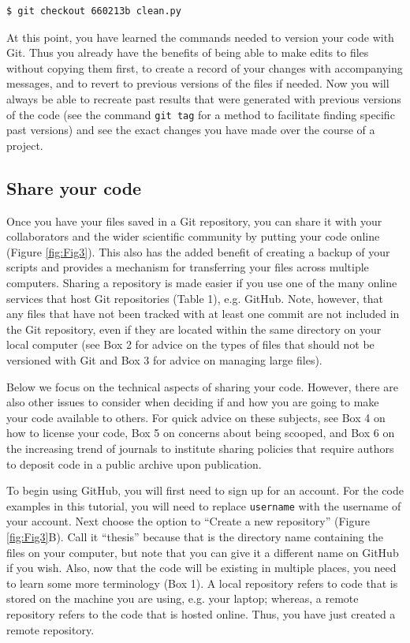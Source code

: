 \documentclass[10pt]{article}
\begin{document}
\begin{verbatim}
$ git checkout 660213b clean.py
\end{verbatim}

At this point, you have learned the commands needed to version your code with Git.
Thus you already have the benefits of being able to make edits to files without copying them first, to create a record of your changes with accompanying messages, and to revert to previous versions of the files if needed.
Now you will always be able to recreate past results that were generated with previous versions of the code (see the command \verb|git tag| for a method to facilitate finding specific past versions) and see the exact changes you have made over the course of a project.


\subsection{Share your code}

Once you have your files saved in a Git repository, you can share it with your collaborators and the wider scientific community by putting your code online (Figure \ref{fig:Fig3}).
This also has the added benefit of creating a backup of your scripts and provides a mechanism for transferring your files across multiple computers.
Sharing a repository is made easier if you use one of the many online services that host Git repositories (Table 1), e.g. GitHub.
Note, however, that any files that have not been tracked with at least one commit are not included in the Git repository, even if they are located within the same directory on your local computer (see Box 2 for advice on the types of files that should not be versioned with Git and Box 3 for advice on managing large files).

Below we focus on the technical aspects of sharing your code.
However, there are also other issues to consider when deciding if and how you are going to make your code available to others.
For quick advice on these subjects, see Box 4 on how to license your code, Box 5 on concerns about being scooped, and Box 6 on the increasing trend of journals to institute sharing policies that require authors to deposit code in a public archive upon publication.

To begin using GitHub, you will first need to sign up for an account.
For the code examples in this tutorial, you will need to replace \verb|username| with the username of your account.
Next choose the option to ``Create a new repository'' (Figure \ref{fig:Fig3}B).
Call it ``thesis'' because that is the directory name containing the files on your computer, but note that you can give it a different name on GitHub if you wish.
Also, now that the code will be existing in multiple places, you need to learn some more terminology (Box 1).
A local repository refers to code that is stored on the machine you are using, e.g. your laptop; whereas, a remote repository refers to the code that is hosted online.
Thus, you have just created a remote repository.
\end{document}
